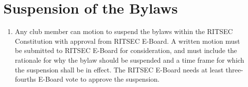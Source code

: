 
\section{Suspension of the Bylaws}

\begin{enumerate}
  \item Any club member can motion to suspend the bylaws within the RITSEC
    Constitution with approval from RITSEC E-Board. A written motion must be
    submitted to RITSEC E-Board for consideration, and must include the
    rationale for why the bylaw should be suspended and a time frame for which
    the suspension shall be in effect. The RITSEC E-Board needs at least
    three-fourths E-Board vote to approve the suspension.
\end{enumerate}